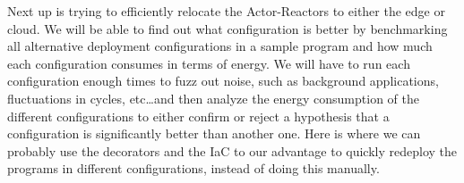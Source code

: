 \documentclass[a4paper]{article}
\begin{document}
Next up is trying to efficiently relocate the Actor-Reactors to either the edge or cloud. We will be able to find out what configuration is better by benchmarking all alternative deployment configurations in a sample program and how much each configuration consumes in terms of energy. We will have to run each configuration enough times to fuzz out noise, such as background applications, fluctuations in cycles, etc\dots and then analyze the energy consumption of the different configurations to either confirm or reject a hypothesis that a configuration is significantly better than another one. Here is where we can probably use the decorators and the IaC to our advantage to quickly redeploy the programs in different configurations, instead of doing this manually.   
\newpage
\printbibliography
\end{document}

